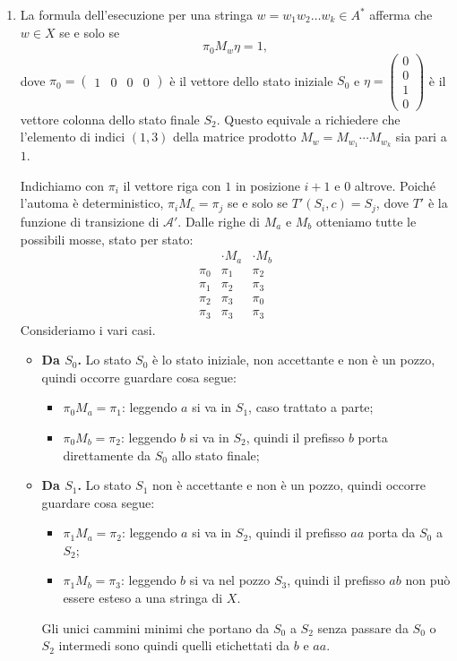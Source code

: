 \begin{sol}
\begin{enumerate}
    \item La formula dell'esecuzione per una stringa $w = w_1 w_2 \dots w_k \in A^*$ afferma che $w \in X$ se e solo se
\[
\pi_0 M_w \eta = 1,
\]
dove $\pi_0 = \begin{pmatrix} 1 & 0 & 0 & 0 \end{pmatrix}$ è il vettore dello stato iniziale $S_0$ e
$\eta = \begin{pmatrix} 0 \\ 0 \\ 1 \\ 0 \end{pmatrix}$ è il vettore colonna dello stato finale $S_2$.
Questo equivale a richiedere che l'elemento di indici $(1,3)$ della matrice prodotto
$M_w = M_{w_1} \cdots M_{w_k}$ sia pari a $1$.

Indichiamo con $\pi_i$ il vettore riga con $1$ in posizione $i+1$ e $0$ altrove. Poiché l'automa è deterministico,
$\pi_i M_c = \pi_j$ se e solo se $T'(S_i,c)=S_j$, dove $T'$ è la funzione di transizione di $\mathcal{A}'$. Dalle righe di $M_a$ e $M_b$ otteniamo
tutte le possibili mosse, stato per stato:
\[
\begin{array}{c|cc}
 & \cdot M_a & \cdot M_b \\ \hline
\pi_0 & \pi_1 & \pi_2 \\
\pi_1 & \pi_2 & \pi_3 \\
\pi_2 & \pi_3 & \pi_0 \\
\pi_3 & \pi_3 & \pi_3
\end{array}
\]
Consideriamo i vari casi.
\begin{itemize}
\item \textbf{Da $S_0$.} Lo stato $S_0$ è lo stato iniziale, non accettante e non è un pozzo, quindi occorre guardare cosa segue:
\begin{itemize}
\item $\pi_0 M_a = \pi_1$: leggendo $a$ si va in $S_1$, caso trattato a parte;
\item $\pi_0 M_b = \pi_2$: leggendo $b$ si va in $S_2$, quindi il prefisso $b$ porta direttamente da $S_0$ allo stato finale;
\end{itemize}

\item \textbf{Da $S_1$.} Lo stato $S_1$ non è accettante e non è un pozzo, quindi occorre guardare cosa segue:
\begin{itemize}
\item $\pi_1 M_a = \pi_2$: leggendo $a$ si va in $S_2$, quindi il prefisso $aa$ porta da $S_0$ a $S_2$;
\item $\pi_1 M_b = \pi_3$: leggendo $b$ si va nel pozzo $S_3$, quindi il prefisso $ab$ non può essere esteso a una stringa di $X$.
\end{itemize}
Gli unici cammini minimi che portano da $S_0$ a $S_2$ senza passare da $S_0$ o $S_2$ intermedi sono
quindi quelli etichettati da $b$ e $aa$.


\end{itemize}
\end{enumerate}
\end{sol}
